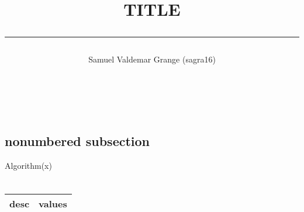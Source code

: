 \documentclass[a4paper,10pt]{article}
\title{TITLE \\\rule{10cm}{0.5mm}}
\author{%
    Samuel Valdemar Grange (sagra16) \\
    \rule{5.5cm}{0.5mm}\\}
\begin{document}
    
    \maketitle
    
    \clearpage

    \section{}
    \subsection*{nonumbered subsection}
    \begin{algorithm}[H]
        \SetAlgoLined
        Algorithm(x)
    \end{algorithm}

    \section{}
    \begin{center} 
        \begin{tabular}{|r|l|} 
        \hline 
        desc & values \\ 
        \hline 
        \end{tabular} 
        \end{center} 
    
    
\end{document}
